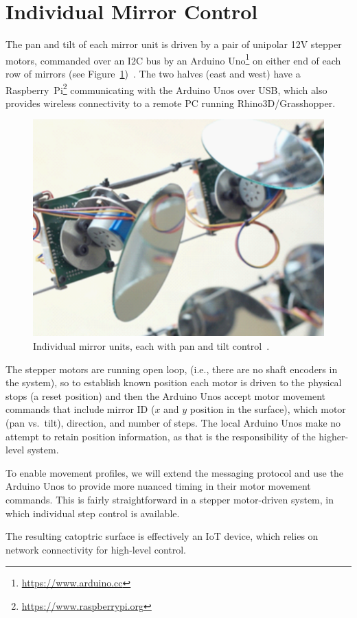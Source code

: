 \section{Individual Mirror Control}
\label{sec:mirror}

The pan and tilt of each mirror unit is driven by a pair of
unipolar 12V stepper motors, commanded over an I2C bus by an
Arduino Uno\footnote{\url{https://www.arduino.cc}} on either end of
each row of mirrors (see Figure~\ref{fig:mirror})~\cite{acadia18}.
The two halves (east and west) have a
Raspberry~Pi\footnote{\url{https://www.raspberrypi.org}}
communicating with the Arduino Unos over USB, which also provides
wireless connectivity to a remote PC running Rhino3D/Grasshopper.

\begin{figure}[ht]
\centering
\includegraphics[width=0.98\columnwidth]{mirror}
\caption{Individual mirror units,
each with pan and tilt control~\protect\cite{acadia18}.}
\label{fig:mirror}
\end{figure}

The stepper motors are running open loop,
(i.e., there are no shaft encoders in the system),
so to establish known position each
motor is driven to the physical stops (a reset position) and then
the Arduino Unos accept motor movement commands that include
mirror ID ($x$ and $y$ position in the surface), which motor (pan vs.\ tilt),
direction, and number of steps.
The local Arduino Unos make no
attempt to retain position information, as that is the responsibility
of the higher-level system.

To enable movement profiles, we will extend the messaging protocol
and use the Arduino Unos to provide more nuanced timing in their
motor movement commands. This is fairly straightforward in a stepper
motor-driven system, in which individual step control is available.

The resulting catoptric surface is effectively an IoT device, which
relies on network connectivity for high-level control.

